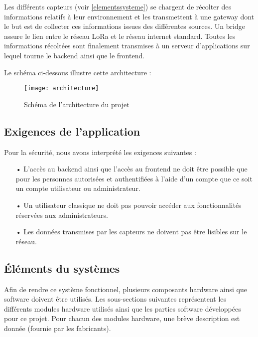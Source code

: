 Les différents capteurs (voir \autoref{elementssysteme}) se chargent de récolter des informations relatifs à leur environnement et les transmettent à une gateway dont le but est de collecter ces informations issues des différentes sources. Un bridge assure le lien entre le réseau LoRa et le réseau internet standard. Toutes les informations récoltées sont finalement transmises à un serveur d'applications sur lequel tourne le backend ainsi que le frontend.

Le schéma ci-dessous illustre cette architecture :

\begin{figure}[h!]
\texttt{[image: architecture]}
\caption{Schéma de l'architecture du projet}
\end{figure}

\subsection{Exigences de l'application} %

Pour la sécurité, nous avons interprété les exigences suivantes :

\begin{itemize}
\item[•] L'accès au backend ainsi que l'accès au frontend ne doit être possible que pour les personnes autorisées et authentifiées à l'aide d'un compte que ce soit un compte utilisateur ou administrateur.
\item[•] Un utilisateur classique ne doit pas pouvoir accéder aux fonctionnalités réservées aux administrateurs.
\item[•] Les données transmises par les capteurs ne doivent pas être lisibles sur le réseau.
\end{itemize}

\newpage
\subsection{Éléments du systèmes}\label{elementssysteme} %

Afin de rendre ce système fonctionnel, plusieurs composants hardware ainsi que software doivent être utilisés. Les sous-sections suivantes représentent les différents modules hardware utilisés ainsi que les parties software développées pour ce projet. Pour chacun des modules hardware, une brève description est donnée (fournie par les fabricants).

